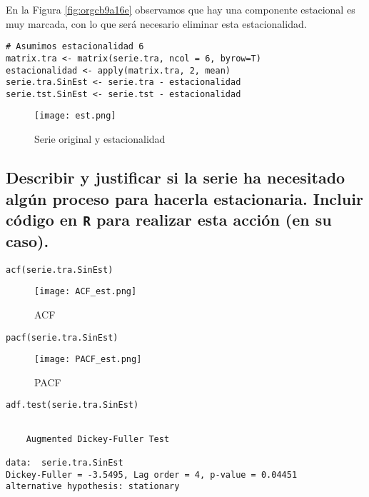 \documentclass[11pt]{article}
\begin{document}
En la Figura \ref{fig:orgcb9a16e}  observamos que hay una componente
 estacional es muy marcada, con lo que será necesario eliminar esta
 estacionalidad. 

\begin{verbatim}
# Asumimos estacionalidad 6
matrix.tra <- matrix(serie.tra, ncol = 6, byrow=T)
estacionalidad <- apply(matrix.tra, 2, mean)
serie.tra.SinEst <- serie.tra - estacionalidad
serie.tst.SinEst <- serie.tst - estacionalidad
\end{verbatim}

\begin{figure}[htbp]
\centering
\texttt{[image: est.png]}
\caption{\label{fig:org3881015}
Serie original y estacionalidad}
\end{figure}



\subsection{Describir y justificar si la serie ha necesitado algún proceso para hacerla estacionaria. Incluir código en \texttt{R} para realizar esta acción (en su caso).}
\label{sec:org6361bda}


\begin{verbatim}
acf(serie.tra.SinEst)
\end{verbatim}

\begin{figure}[htbp]
\centering
\texttt{[image: ACF\_est.png]}
\caption{\label{fig:org0ecd06f}
ACF}
\end{figure}

\begin{verbatim}
pacf(serie.tra.SinEst)
\end{verbatim}

\begin{figure}[htbp]
\centering
\texttt{[image: PACF\_est.png]}
\caption{\label{fig:orgd7497f0}
PACF}
\end{figure}

\begin{verbatim}
adf.test(serie.tra.SinEst)
\end{verbatim}

\begin{verbatim}

	Augmented Dickey-Fuller Test

data:  serie.tra.SinEst
Dickey-Fuller = -3.5495, Lag order = 4, p-value = 0.04451
alternative hypothesis: stationary
\end{verbatim}
\end{document}
